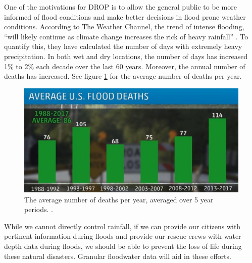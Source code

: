 \documentclass[letter]{article}
\begin{document}
One of the motivations for DROP is to allow the general public to be more informed of flood conditions and make better decisions in flood prone weather conditions. According to The Weather Channel, the trend of intense flooding, ``will likely continue as climate change increases the rick of heavy rainfall'' \cite{floodDeaths}. To quantify this, they have calculated the number of days with extremely heavy precipitation. In both wet and dry locations, the number of days has increased 1\% to 2\% each decade over the last 60 years. Moreover, the annual number of deaths has increased. See figure \ref{fig:floodDeaths} for the average number of deaths per year. 
\begin{figure}[ht]
\centering
\includegraphics[width=.6\textwidth]{img/floodDeaths.png}
\caption{\label{fig:floodDeaths}The average number of deaths per year, averaged over 5 year periods. \cite{floodDeaths}.}
\end{figure}

While we cannot directly control rainfall, if we can provide our citizens with pertinent information during floods and provide our rescue crews with water depth data during floods, we should be able to prevent the loss of life during these natural disasters. Granular floodwater data will aid in these efforts. 
\end{document}
